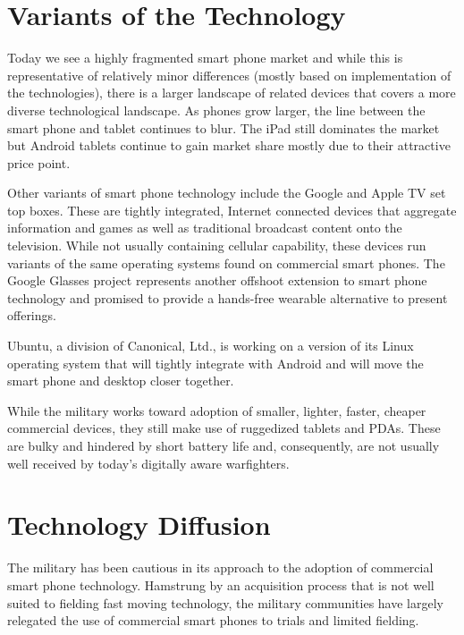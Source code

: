 \documentclass[letterpaper,12pt]{article}
\begin{document}
\section*{Variants of the Technology}
Today we see a highly fragmented smart phone market and while this is representative of relatively minor differences (mostly based on implementation of the technologies), there is a larger landscape of related devices that covers a more diverse technological landscape.  As phones grow larger, the line between the smart phone and tablet continues to blur.  The iPad still dominates the market but Android tablets continue to gain market share mostly due to their attractive price point.

Other variants of smart phone technology include the Google and Apple TV set top boxes.  These are tightly integrated, Internet connected devices that aggregate information and games as well as traditional broadcast content onto the television.  While not usually containing cellular capability, these devices run variants of the same operating systems found on commercial smart phones.  The Google Glasses project represents another offshoot extension to smart phone technology and promised to provide a hands-free wearable alternative to present offerings.

Ubuntu, a division of Canonical, Ltd., is working on a version of its Linux operating system that will tightly integrate with Android and will move the smart phone and desktop closer together.

While the military works toward adoption of smaller, lighter, faster, cheaper commercial devices, they still make use of ruggedized tablets and PDAs.  These are bulky and hindered by short battery life and, consequently, are not usually well received by today's digitally aware warfighters.

\section*{Technology Diffusion}
The military has been cautious in its approach to the adoption of commercial smart phone technology.  Hamstrung by an acquisition process that is not well suited to fielding fast moving technology, the military communities have largely relegated the use of commercial smart phones to trials and limited fielding.
\end{document}
